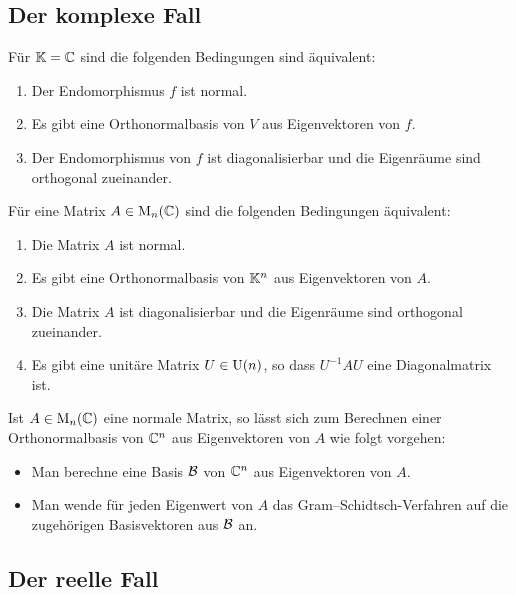 \subsection{Der komplexe Fall}

\begin{theorem}
  Für $\mathbb{K} = \mathbb{C}$ sind die folgenden Bedingungen sind äquivalent:
  \begin{enumerate}
    \item
      Der Endomorphismus $f$ ist normal.
    \item
      Es gibt eine Orthonormalbasis von $V$ aus Eigenvektoren von $f$.
    \item
      Der Endomorphismus von $f$ ist diagonalisierbar und die Eigenräume sind orthogonal zueinander.
  \end{enumerate}
\end{theorem}

\begin{corollary}
  Für eine Matrix $A \in \operatorname{M}_{n}(\mathbb{C})$ sind die folgenden Bedingungen äquivalent:
  \begin{enumerate}
    \item
      Die Matrix $A$ ist normal.
    \item
      Es gibt eine Orthonormalbasis von $\mathbb{K}^n$ aus Eigenvektoren von $A$.
    \item
      Die Matrix $A$ ist diagonalisierbar und die Eigenräume sind orthogonal zueinander.
    \item
      Es gibt eine unitäre Matrix $U \in \operatorname{U}(n)$, so dass $U^{-1} A U$ eine Diagonalmatrix ist.
  \end{enumerate}
\end{corollary}


Ist $A \in \operatorname{M}_{n}(\mathbb{C})$ eine normale Matrix, so lässt sich zum Berechnen einer Orthonormalbasis von $\mathbb{C}^n$ aus Eigenvektoren von $A$ wie folgt vorgehen:
\begin{itemize}
  \item
    Man berechne eine Basis $\mathcal{B}$ von $\mathbb{C}^n$ aus Eigenvektoren von $A$.
  \item
    Man wende für jeden Eigenwert von $A$ das Gram--Schidtsch-Verfahren auf die zugehörigen Basisvektoren aus $\mathcal{B}$ an.
\end{itemize}



\subsection{Der reelle Fall}

